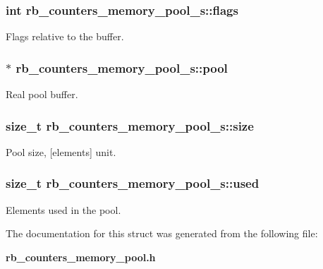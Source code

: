 \subsubsection[{flags}]{\setlength{\rightskip}{0pt plus 5cm}int rb\_counters\_memory\_pool\_s\+::flags}\label{structrb__counters__memory__pool__s_afb2ebc67257a860c5e19bc33a7735b32}


Flags relative to the buffer. 

\subsubsection[{pool}]{$\ast$ rb\_counters\_memory\_pool\_s\+::pool}\label{structrb__counters__memory__pool__s_a35c4d7d5ab4718a7841cbcffb3a23bc3}


Real pool buffer. 

\subsubsection[{size}]{\setlength{\rightskip}{0pt plus 5cm}size\_t rb\_counters\_memory\_pool\_s\+::size}\label{structrb__counters__memory__pool__s_a884d46240b78bb76ae0969006b3ff5df}


Pool size, [elements] unit. 

\subsubsection[{used}]{\setlength{\rightskip}{0pt plus 5cm}size\_t rb\_counters\_memory\_pool\_s\+::used}\label{structrb__counters__memory__pool__s_a52376ec30e09f9131677466d599433fe}


Elements used in the pool. 



The documentation for this struct was generated from the following file\+:\begin{DoxyCompactItemize}
\item 
{\bf rb\_counters\_memory\_pool.\+h}\end{DoxyCompactItemize}
